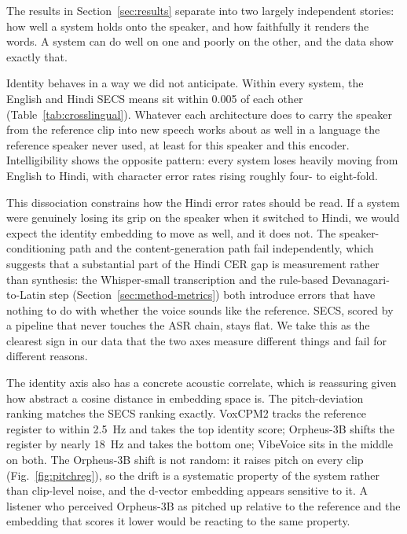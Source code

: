 \documentclass[conference]{IEEEtran}
\begin{document}
The results in Section~\ref{sec:results} separate into two largely
independent stories: how well a system holds onto the speaker, and how
faithfully it renders the words. A system can do well on one and poorly on
the other, and the data show exactly that.

Identity behaves in a way we did not anticipate. Within every system, the
English and Hindi SECS means sit within 0.005 of each other
(Table~\ref{tab:crosslingual}). Whatever each architecture does to carry the
speaker from the reference clip into new speech works about as well in a
language the reference speaker never used, at least for this speaker and this
encoder. Intelligibility shows the opposite pattern: every system loses
heavily moving from English to Hindi, with character error rates rising
roughly four- to eight-fold.

This dissociation constrains how the Hindi error rates should be read. If a
system were genuinely losing its grip on the speaker when it switched to
Hindi, we would expect the identity embedding to move as well, and it does
not. The speaker-conditioning path and the content-generation path fail
independently, which suggests that a substantial part of the Hindi CER gap is
measurement rather than synthesis: the Whisper-small transcription and the
rule-based Devanagari-to-Latin step (Section~\ref{sec:method-metrics}) both
introduce errors that have nothing to do with whether the voice sounds like
the reference. SECS, scored by a pipeline that never touches the ASR chain,
stays flat. We take this as the clearest sign in our data that the two axes
measure different things and fail for different reasons.

The identity axis also has a concrete acoustic correlate, which is reassuring
given how abstract a cosine distance in embedding space is. The
pitch-deviation ranking matches the SECS ranking exactly. VoxCPM2 tracks the
reference register to within 2.5~Hz and takes the top identity score;
Orpheus-3B shifts the register by nearly 18~Hz and takes the bottom one;
VibeVoice sits in the middle on both. The Orpheus-3B shift is not random: it
raises pitch on every clip (Fig.~\ref{fig:pitchreg}), so the drift is a
systematic property of the system rather than clip-level noise, and the
d-vector embedding appears sensitive to it. A listener who perceived
Orpheus-3B as pitched up relative to the reference and the embedding that
scores it lower would be reacting to the same property.
\end{document}
